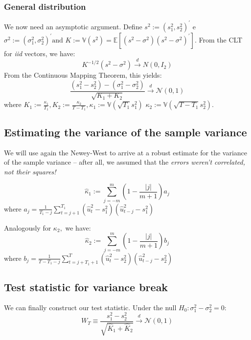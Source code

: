 \documentclass[11pt, a4paper]{report}
\theoremstyle{plain}
\theoremstyle{plain}
\theoremstyle{remark}
\begin{document}
\subsubsection{General distribution}

We now need an asymptotic argument. Define $s^{2}:=\left(s_{1}^{2}, s_{2}^{2}\right)^{\prime}$ e $\sigma^{2}:=\left(\sigma_{1}^{2}, \sigma_{2}^{2}\right)^{\prime} \mathrm{and}$
$K:=\mathbb{V}\left(s^{2}\right)=\mathbb{E}\left[\left(s^{2}-\sigma^{2}\right)\left(s^{2}-\sigma^{2}\right)^{\prime}\right] .$ From the CLT for \textit{iid} vectors, we have:
$$
K^{-1 / 2}\left(s^{2}-\sigma^{2}\right) \stackrel{d}{\longrightarrow} N\left(0, I_{2}\right)
$$
From the Continuous Mapping Theorem, this yields:
$$
\frac{\left(s_{1}^{2}-s_{2}^{2}\right)-\left(\sigma_{1}^{2}-\sigma_{2}^{2}\right)}{\sqrt{K_{1}+K_{2}}} \stackrel{d}{\longrightarrow} \mathcal{N}(0,1)
$$
where $K_{1}:=\frac{\kappa_{1}}{T_{1}}, K_{2}:=\frac{\kappa_{2}}{T-T_{1}}, \kappa_{1}:=\mathbb{V}\left(\sqrt{T_{1}} s_{1}^{2}\right)$
$\kappa_{2}:=\mathbb{V}\left(\sqrt{T-T_{1}} s_{2}^{2}\right).$

\subsection{Estimating the variance of the sample variance}

We will use again the Newey-West to arrive at a robust estimate for the variance of the sample variance -- after all, we assumed that the \textit{errors weren't correlated, not their squares!}

$$
\widehat{\kappa}_{1}:=\sum_{j=-m}^{m}\left(1-\frac{|j|}{m+1}\right) a_{j}
$$
where $a_{j}=\frac{1}{T_{1}-j} \sum_{t=j+1}^{T_{1}}\left(\widehat{u}_{t}^{2}-s_{1}^{2}\right)\left(\widehat{u}_{t-j}^{2}-s_{1}^{2}\right)$

Analogously for $\kappa_{2},$ we have:
$$
\widehat{\kappa}_{2}:=\sum_{j=-m}^{m}\left(1-\frac{|j|}{m+1}\right) b_{j}
$$
where $b_{j}=\frac{1}{T-T_{1}-j} \sum_{t=j+T_{1}+1}^{T}\left(\widehat{u}_{t}^{2}-s_{2}^{2}\right)\left(\widehat{u}_{t-j}^{2}-s_{2}^{2}\right)$

\subsection{Test statistic for variance break}

We can finally construct our test statistic. Under the null $H_0: \sigma_1^2 - \sigma_2^2 = 0:$
$$
W_{T} \equiv \frac{s_{1}^{2}-s_{2}^{2}}{\sqrt{\widehat{K}_{1}+\widehat{K}_{2}}} \stackrel{d}{\longrightarrow} \mathcal{N}(0,1)
$$
\end{document}

